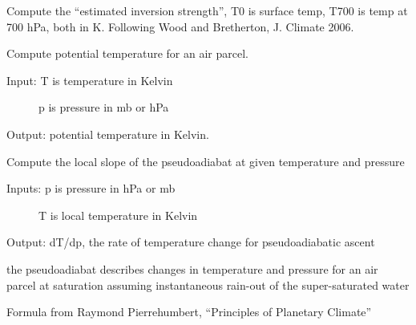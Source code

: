 \documentclass[letterpaper,10pt,english]{sphinxmanual}
\begin{document}

\begin{fulllineitems}
\label{api/climlab.utils:climlab.utils.thermo.estimated_inversion_strength}
Compute the ``estimated inversion strength'', T0 is surface temp, T700 is temp at 700 hPa, both in K.
Following Wood and Bretherton, J. Climate 2006.

\end{fulllineitems}


\begin{fulllineitems}
\label{api/climlab.utils:climlab.utils.thermo.potential_temperature}
Compute potential temperature for an air parcel.
\begin{description}
\item[{Input:  T is temperature in Kelvin}] \leavevmode
p is pressure in mb or hPa

\end{description}

Output: potential temperature in Kelvin.

\end{fulllineitems}


\begin{fulllineitems}
\label{api/climlab.utils:climlab.utils.thermo.pseudoadiabat}
Compute the local slope of the pseudoadiabat at given temperature and pressure
\begin{description}
\item[{Inputs:   p is pressure in hPa or mb}] \leavevmode
T is local temperature in Kelvin

\end{description}

Output:   dT/dp, the rate of temperature change for pseudoadiabatic ascent

the pseudoadiabat describes changes in temperature and pressure for an air 
parcel at saturation assuming instantaneous rain-out of the super-saturated water

Formula from Raymond Pierrehumbert, ``Principles of Planetary Climate''

\end{fulllineitems}
\end{document}

